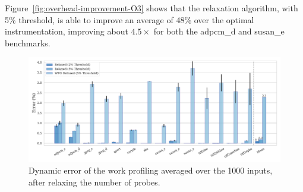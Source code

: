 Figure~\ref{fig:overhead-improvement-O3} shows that the relaxation algorithm, with 5\% threshold, is able to improve an average of 48\% over the optimal instrumentation, improving about $4.5\times$ for both the {\flagstype adpcm\_d} and {\flagstype susan\_e} benchmarks.

\begin{figure}[h!]
    \centering
    \includegraphics[width=\textwidth]{figs/error-O3.pdf}
    \caption{Dynamic error of the work profiling averaged over the 1000 inputs, after relaxing the number of probes.}
    \label{fig:error-O3}
\end{figure}


%




